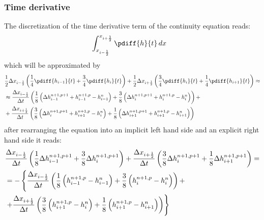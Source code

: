 \subsubsection{Time derivative}
The discretization of the time derivative term of the continuity equation reads:
\begin{align}
    & \int^{x_{i+\half}}_{x_{i-\half}} \pdiff{h}{t}\, dx
\end{align}
which will be approximated by
\begin{align}
    &\half \Delta x_{i-\half} \left( \frac{1}{4}\pdiff{h_{i-1}}{t} + \frac{3}{4}\pdiff{h_{i}}{t}  \right) +
    \half \Delta x_{i+\half} \left( \frac{3}{4}\pdiff{h_{i}}{t} + \frac{1}{4}\pdiff{h_{i+1}}{t} \right) \approx
    \nonumber \\*
    & \approx
    \frac{\Delta x_{i-\half}}{\Dt} \left(
    \frac{1}{8}\left(\Delta h^{n+1,p+1}_{i-1} + h^{n+1,p}_{i-1} - h^{n}_{i-1} \right) + \frac{3}{8}\left(\Delta h^{n+1,p+1}_{i} + h^{n+1,p}_{i}- h^{n}_{i}\right)
    \right) +
    \nonumber \\*
    & +
    \frac{\Delta x_{i+\half}}{\Dt} \left( \frac{3}{8}\left(\Delta h^{n+1,p+1}_{i} + h^{n+1,p}_{i+1}- h^{n}_{i}\right) + \frac{1}{8}\left(\Delta h^{n+1,p+1}_{i+1} + h^{n+1,p}_{i+1}- h^{n}_{i+1}\right)
    \right)
\end{align}
after rearranging the equation into an implicit left hand side and an explicit right hand side  it reads:
\begin{align}
    &  \frac{\Delta x_{i-\frac{1}{2}}}{\Delta t} \left(
    \frac{1}{8}\Delta h^{n+1,p+1}_{i-1} + \frac{3}{8}\Delta h^{n+1,p+1}_{i}
    \right) +
    \frac{\Delta x_{i+\frac{1}{2}}}{\Delta t} \left( \frac{3}{8}\Delta h^{n+1,p+1}_{i} + \frac{1}{8}\Delta h^{n+1,p+1}_{i+1}
    \right) =
    \nonumber \\
    &  = -\left\{
    \frac{\Delta x_{i-\frac{1}{2}}}{\Delta t} \left(
\frac{1}{8}\left(h^{n+1,p}_{i-1} - h^{n}_{i-1} \right) + \frac{3}{8}\left(h^{n+1,p}_{i}- h^{n}_{i}\right)
\right) + \right.
\nonumber \\*
& \left. +
\frac{\Delta x_{i+\frac{1}{2}}}{\Delta t} \left( \frac{3}{8}\left(h^{n+1,p}_{i+1}- h^{n}_{i}\right) + \frac{1}{8}\left(h^{n+1,p}_{i+1}- h^{n}_{i+1}\right)
\right)\right\}
\end{align}

